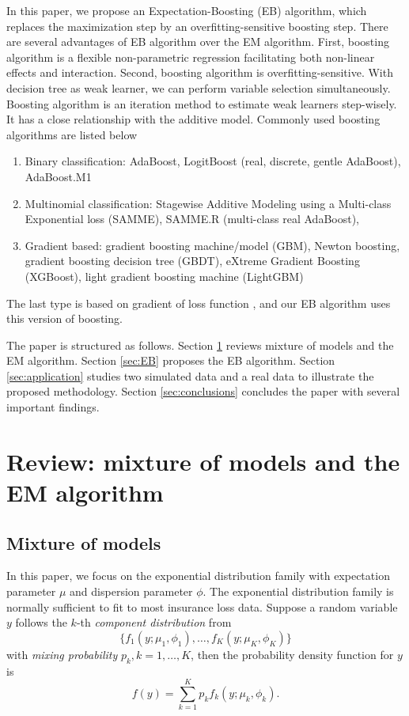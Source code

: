 \documentclass[11pt]{article}
\numberwithin{equation}{section}
\begin{document}
In this paper, we propose an Expectation-Boosting (EB) algorithm, which replaces the maximization step by an overfitting-sensitive boosting step. 
There are several advantages of EB algorithm over the EM algorithm. 
First, boosting algorithm is a flexible non-parametric regression facilitating both non-linear effects and interaction. 
Second, boosting algorithm is overfitting-sensitive. With decision tree as weak learner, we can perform variable selection simultaneously. 
Boosting algorithm is an iteration method to estimate weak learners step-wisely.
It has a close relationship with the additive model.
Commonly used boosting algorithms are listed below
	\begin{enumerate}
		
		\item Binary classification: {AdaBoost}, LogitBoost (real, discrete, gentle AdaBoost), AdaBoost.M1
		
		\item Multinomial classification: Stagewise Additive Modeling using a Multi-class Exponential loss (SAMME), SAMME.R (multi-class real AdaBoost),
		\item {Gradient based}: {gradient boosting machine/model (GBM)}, Newton boosting, gradient boosting decision tree (GBDT), {eXtreme Gradient Boosting (XGBoost)}, {light gradient boosting machine (LightGBM)}
	\end{enumerate}
The last type is based on {gradient of loss function} \citep{friedman2001greedy}, and our EB algorithm uses this version of boosting.

The paper is structured as follows. Section \ref{sec:review} reviews mixture of models and the EM algorithm. Section \ref{sec:EB} proposes the EB algorithm. Section \ref{sec:application} studies two simulated data and a real data to illustrate the proposed methodology. Section \ref{sec:conclusions} concludes the paper with several important findings.  


\section{Review: mixture of models and the EM algorithm}\label{sec:review}


\subsection{Mixture of models}\label{review:mix1}
In this paper, we focus on the exponential distribution family with expectation parameter $\mu$ and dispersion parameter $\phi$. The exponential distribution family is normally sufficient to fit to most insurance loss data.
	Suppose a random variable $y$ follows the $k$-th {\it component distribution} from
	$$\{f_1(y;\mu_1,\phi_1),\ldots,f_K(y;\mu_K,\phi_K)\}$$
	with \textit{mixing probability} $p_k, k=1,\ldots,K$,
	then the probability density function for $y$ is
	$$f(y)=\sum_{k=1}^Kp_kf_k(y;\mu_k,\phi_k).$$
\end{document}
